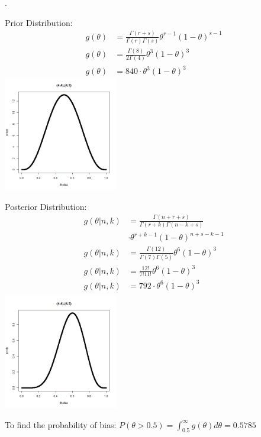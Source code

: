 \documentclass[12pt]{article}
\newenvironment{problem}[2][Problem]{\begin{trivlist}
\item[\hskip \labelsep {\bfseries #1}\hskip \labelsep {\bfseries #2.}]}{\end{trivlist}}
\begin{document}
\begin{problem}{(1,1),(20,11)}
\end{problem}
\newpage
\begin{problem}{(4,4),(4,3)}.
\begin{multicols}{2}
 Prior Distribution: 
\begin{align*}
  g(\theta) &= \frac{\Gamma (r+s)}{\Gamma (r) \Gamma (s)} \theta^{r-1}(1-\theta)^{s-1} \\
    g(\theta) &= \frac{\Gamma (8)}{2\Gamma (4)} \theta^{3}(1-\theta)^{3} \\
    g(\theta) &= 840 \cdot \theta^{3}(1-\theta)^{3}
\end{align*}
\columnbreak
  \includegraphics[width=5cm]{4443_prior2.png}
 \label{fig:boat1}
\end{multicols}

\begin{multicols}{2}
Posterior Distribution: 
\begin{align*}
    g(\theta | n,k) &= \frac{\Gamma (n+r+s)}{\Gamma (r+k) \Gamma (n-k+s)} \\
    & \cdot \theta^{r+k-1}(1-\theta)^{n+s-k-1} \\
    g(\theta | n,k) &= \frac{\Gamma (12)}{\Gamma (7) \Gamma (5)} \theta^{6}(1-\theta)^{3} \\
    g(\theta | n,k) &= \frac{12!}{7!11!} \theta^{6}(1-\theta)^{3} \\
    g(\theta | n,k) &= 792 \cdot \theta^{6}(1-\theta)^{3} \\
\end{align*}
\columnbreak
  \includegraphics[width=5cm]{4443_post.png}
 \label{fig:boat1}
\end{multicols}
To find the probability of bias: $P(\theta > 0.5) = \int_{0.5}^{\infty} g(\theta ) d\theta =  0.5785$

\end{problem}
\newpage
\end{document}
